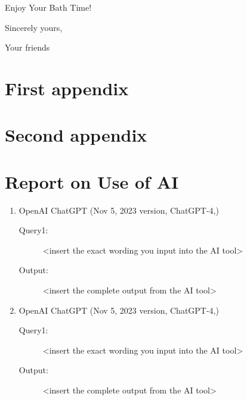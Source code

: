 \documentclass{mcmthesis}
\begin{document}
	\begin{letter}{Enjoy Your Bath Time!}
		
		
		\vspace{\parskip}
		
		Sincerely yours,
		
		Your friends
		
	\end{letter}
	
	
	
	
	
	
	
	
	
	
	\newpage
	\printbibliography
	
	
	
	
	\begin{appendices}
		\section{First appendix}
		\section{Second appendix}
	\end{appendices}
	
	
	
	
	\newpage
	\setcounter{lastpage}{\value{page}}
	\thispagestyle{empty} 
	
	\section*{Report on Use of AI}
	
	\begin{enumerate}
		\item OpenAI ChatGPT (Nov 5, 2023 version, ChatGPT-4,) 
		\begin{description}
			\item[Query1:] <insert the exact wording you input into the AI tool> 
			\item[Output:] <insert the complete output from the AI tool>
		\end{description}
		
		\item OpenAI ChatGPT (Nov 5, 2023 version, ChatGPT-4,) 
		\begin{description}
			\item[Query1:] <insert the exact wording you input into the AI tool> 
			\item[Output:] <insert the complete output from the AI tool>
		\end{description}
		
	\end{enumerate}
	
	\clearpage
	\setcounter{page}{\value{lastpage}}
	
	
	
	
	
	
\end{document}

